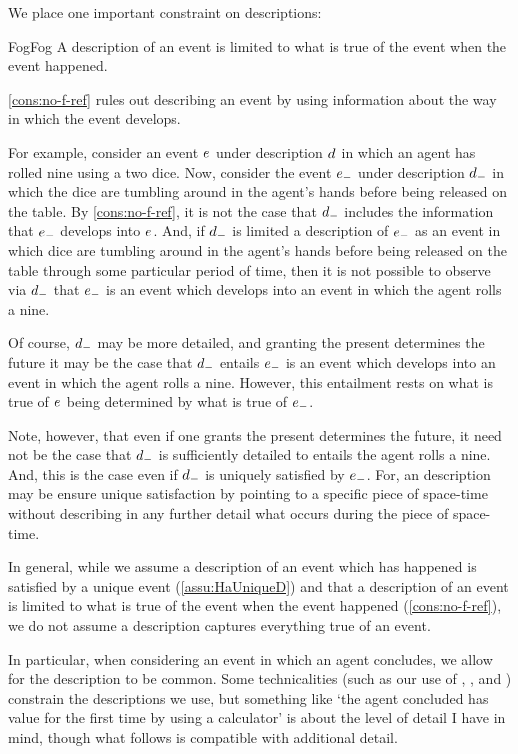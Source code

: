 \begin{note}
  We place one important constraint on descriptions:

  \begin{constraint}{Fog}{Fog}%
    \label{cons:no-f-ref}%
    A description of an event is limited to what is true of the event when the event happened.
  \end{constraint}

  \noindent%
  \autoref{cons:no-f-ref} rules out describing an event by using information about the way in which the event develops.

  For example, consider an event \(e\sb{}\) under description \(d\sb{}\) in which an agent has rolled nine using a two dice.
  Now, consider the event \(e\sb{-}\) under description \(d\sb{-}\) in which the dice are tumbling around in the agent's hands before being released on the table.
  By \autoref{cons:no-f-ref}, it is not the case that \(d\sb{-}\) includes the information that \(e\sb{-}\) develops into \(e\sb{}\).
  And, if \(d\sb{-}\) is limited a description of \(e\sb{-}\) as an event in which dice are tumbling around in the agent's hands before being released on the table through some particular period of time, then it is not possible to observe via \(d\sb{-}\) that \(e\sb{-}\) is an event which develops into an event in which the agent rolls a nine.

  Of course, \(d\sb{-}\) may be more detailed, and granting the present determines the future it may be the case that \(d\sb{-}\) entails \(e\sb{-}\) is an event which develops into an event in which the agent rolls a nine.
  However, this entailment rests on what is true of \(e\sb{}\) being determined by what is true of \(e\sb{-}\).

  Note, however, that even if one grants the present determines the future, it need not be the case that \(d\sb{-}\) is sufficiently detailed to entails the agent rolls a nine.
  And, this is the case even if \(d\sb{-}\) is uniquely satisfied by \(e\sb{-}\).
  For, an description may be ensure unique satisfaction by pointing to a specific piece of space-time without describing in any further detail what occurs during the piece of space-time.
\end{note}


\begin{note}
  In general, while we assume a description of an event which has happened is satisfied by a unique event (\autoref{assu:HaUniqueD}) and that a description of an event is limited to what is true of the event when the event happened (\autoref{cons:no-f-ref}), we do not assume a description captures everything true of an event.

  In particular, when considering an event in which an agent concludes, we allow for the description to be common.
  Some technicalities (such as our use of , , and ) constrain the descriptions we use, but something like `the agent concluded \gistCalcEq{} has value  for the first time by using a calculator' is about the level of detail I have in mind, though what follows is compatible with additional detail.
\end{note}




